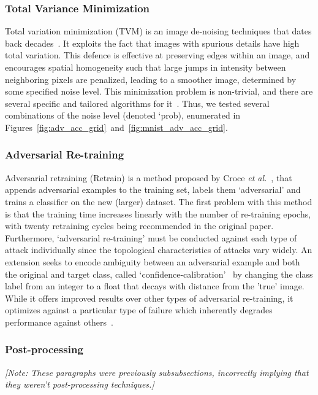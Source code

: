 \documentclass[journal]{IEEEtran}
\newcommand{\cm}[1]{\textit{{\color{blue}#1}}}
\begin{document}
\subsubsection{Total Variance Minimization}
Total variation minimization (TVM) is an image de-noising techniques that dates back decades~\cite{rudin1992nonlinear}. It exploits the fact that images with spurious details have high total variation. This defence is effective at preserving edges within an image, and encourages spatial homogeneity such that large jumps in intensity between neighboring pixels are penalized, leading to a smoother image, determined by some specified noise level. This minimization problem is non-trivial, and there are several specific and tailored algorithms for it~\cite{chambolle2004algorithm,hadj2018continuation}. Thus, we tested several combinations of the noise level (denoted `prob),  enumerated in Figures~\ref{fig:adv_acc_grid}~and~\ref{fig:mnist_adv_acc_grid}.

\subsubsection{Adversarial Re-training}
Adversarial retraining (Retrain) is a method proposed by Croce \textit{et al.}~\cite{tsipras_robustness_2019}, that appends adversarial examples to the training set, labels them `adversarial' and trains a classifier on the new (larger) dataset. The first problem with this method is that the training time increases linearly with the number of re-training epochs, with twenty retraining cycles being recommended in the original paper. Furthermore, `adversarial re-training' must be conducted against each type of attack individually since the topological characteristics of attacks vary widely. An extension seeks to encode ambiguity between an adversarial example and both the original and target class, called `confidence-calibration'~\cite{croce_reliable_2020} by changing the class label from an integer to a float that decays with distance from the 'true' image. While it offers improved results over other types of adversarial re-training, it optimizes against a particular type of failure which inherently degrades performance against others~\cite{carlini_towards_2017}.

\subsubsection{Post-processing}
\label{post-processing}

\cm{[Note: These paragraphs were previously subsubsections, incorrectly implying that they weren't post-processing techniques.]}
\end{document}
